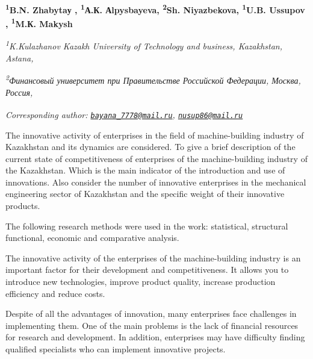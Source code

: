 
\begin{articleheader}

{\bfseries 
\textsuperscript{1}B.N. Zhabytaу\textsuperscript{\envelope } \authorid,
\textsuperscript{1}А.К. Аlpysbayeva\authorid,
\textsuperscript{2}Sh. Niyazbekova\authorid,
\textsuperscript{1}U.B. Ussupov\textsuperscript{\envelope } \authorid,
\textsuperscript{1}M.К. Makysh\authorid}
\end{articleheader}

\begin{affiliation}
\emph{\textsuperscript{1}K.Kulazhanov Kazakh University of Technology and business, Kazakhstan, Astana,}

\emph{\textsuperscript{2}Финансовый университет при Правительстве Российской Федерации, Москва, Россия,}

\raggedright \textsuperscript{\envelope }{\em Corresponding author: \href{mailto:bayana_7778@mail.ru}{\nolinkurl{bayana\_7778@mail.ru}}, \href{mailto:nusup86@mail.ru}{\nolinkurl{nusup86@mail.ru}}}
\end{affiliation}

The innovative activity of enterprises in the field of machine-building
industry of Kazakhstan and its dynamics are considered. To give a brief
description of the current state of competitiveness of enterprises of
the machine-building industry of the Kazakhstan. Which is the main
indicator of the introduction and use of innovations. Also consider the
number of innovative enterprises in the mechanical engineering sector of
Kazakhstan and the specific weight of their innovative products.

The following research methods were used in the work: statistical,
structural functional, economic and comparative analysis.

The innovative activity of the enterprises of the machine-building
industry is an important factor for their development and
competitiveness. It allows you to introduce new technologies, improve
product quality, increase production efficiency and reduce costs.

Despite of all the advantages of innovation, many enterprises face
challenges in implementing them. One of the main problems is the lack of
financial resources for research and development. In addition,
enterprises may have difficulty finding qualified specialists who can
implement innovative projects.

